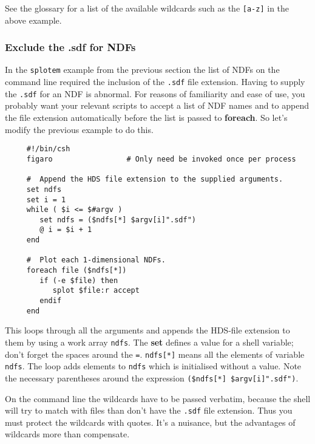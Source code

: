 \documentclass[twoside,11pt]{article}
\newcommand{\htmlref}[2]{#1}
\newcommand{\xref}[3]{#1}
\newcommand{\xlabel}[1]{}
\newcommand{\latexelsehtml}[2]{#1}
\newcommand{\latexelsehtml}[2]{#2}
\newcommand{\HDSref}{\xref{HDS}{sun92}{}}
\newcommand{\NDFref}[1]{\xref{#1}{sun33}{}}
\begin{document}
See the glossary for a list of the available
\htmlref{{\sf wildcards}}{sc4_gl_wild} such as the {\tt [a-z]} in the
above example.

\subsubsection{\xlabel{sc4_se_wildcard_nosdf}Exclude the .sdf for NDFs
\label{sc4_se_wildcard_nosdf}}

In the \latexelsehtml{{\tt splotem} example from the previous
section}{\htmlref{splotem example}{sc4_se_wildcard_lists}} the list of
\NDFref{{\sf NDF}s} on the command line required the inclusion of
the {\tt .sdf} file extension.  Having to supply the {\tt .sdf} for an
NDF is abnormal.  For reasons of familiarity and ease of use, you
probably want your relevant scripts to accept a list of NDF names and
to append the file extension automatically before the list is passed to
{\bf foreach}.  \latexelsehtml{So let's modify the
previous example to do this.}{Here is an example.  It is a modified
version of the {\tt splotem} script.}

\small
\begin{verbatim}
     #!/bin/csh
     figaro                 # Only need be invoked once per process

     #  Append the HDS file extension to the supplied arguments.
     set ndfs
     set i = 1
     while ( $i <= $#argv )
        set ndfs = ($ndfs[*] $argv[i]".sdf")
        @ i = $i + 1
     end

     #  Plot each 1-dimensional NDFs.
     foreach file ($ndfs[*])
        if (-e $file) then
           splot $file:r accept
        endif
     end
\end{verbatim}
\normalsize
This loops through all the arguments and appends the {\sf
\HDSref}-file extension to them by using a work array {\tt ndfs}.  The
{\bf set} defines a value for a \htmlref{{\sf shell
variable}}{sc4_gl_she_var}; don't forget the spaces around the {\tt =}.
{\tt ndfs[*]} means all the elements of variable {\tt ndfs}.  The loop
adds elements to {\tt ndfs} which is initialised without a value.
Note the necessary parentheses around the expression {\tt (\$ndfs[*]
\$argv[i]".sdf")}.

On the command line the wildcards have to be passed verbatim, because
the shell will try to match with files than don't have the {\tt .sdf} 
file extension.  Thus you must protect the wildcards with quotes.
It's a nuisance, but the advantages of wildcards more than compensate.
\end{document}
